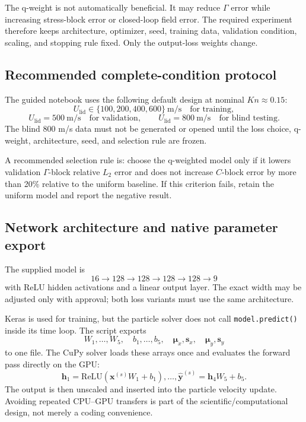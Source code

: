 \documentclass[11pt]{article}
\newcommand{\file}[1]{\path{#1}}
\begin{document}
The q-weight is not automatically beneficial. It may reduce $\Gamma$ error while increasing stress-block error or closed-loop field error. The required experiment therefore keeps architecture, optimizer, seed, training data, validation condition, scaling, and stopping rule fixed. Only the output-loss weights change.

\subsection{Recommended complete-condition protocol}
The guided notebook uses the following default design at nominal $Kn\approx0.15$:
\[
U_{\mathrm{lid}}\in\{100,200,400,600\}\ \mathrm{m/s}
\quad\text{for training},
\]
\[
U_{\mathrm{lid}}=500\ \mathrm{m/s}
\quad\text{for validation},
\qquad
U_{\mathrm{lid}}=800\ \mathrm{m/s}
\quad\text{for blind testing}.
\]
The blind 800 m/s data must not be generated or opened until the loss choice, q-weight, architecture, seed, and selection rule are frozen.

A recommended selection rule is: choose the q-weighted model only if it lowers validation $\Gamma$-block relative $L_2$ error and does not increase $C$-block error by more than 20\% relative to the uniform baseline. If this criterion fails, retain the uniform model and report the negative result.

\subsection{Network architecture and native parameter export}
The supplied model is
\[
16\rightarrow128\rightarrow128\rightarrow128\rightarrow128\rightarrow9
\]
with ReLU hidden activations and a linear output layer. The exact width may be adjusted only with approval; both loss variants must use the same architecture.

Keras is used for training, but the particle solver does not call \texttt{model.predict()} inside its time loop. The script exports
\[
W_1,\ldots,W_5,\quad b_1,\ldots,b_5,
\quad \boldsymbol\mu_x,\boldsymbol s_x,
\quad \boldsymbol\mu_y,\boldsymbol s_y
\]
to one \file{.npz} file. The CuPy solver loads these arrays once and evaluates the forward pass directly on the GPU:
\[
\mathbf h_1=\mathrm{ReLU}(\mathbf x^{(s)}W_1+b_1),\ldots,
\widehat{\mathbf y}^{(s)}=\mathbf h_4W_5+b_5.
\]
The output is then unscaled and inserted into the particle velocity update. Avoiding repeated CPU--GPU transfers is part of the scientific/computational design, not merely a coding convenience.
\end{document}
